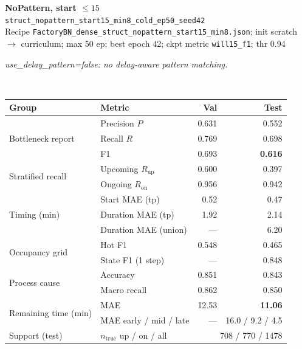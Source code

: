 \documentclass[9pt,a4paper,twocolumn]{extarticle}
\begin{document}
\noindent\begin{minipage}{\columnwidth}
\begin{center}
{\small\bfseries NoPattern, start $\le 15$}\\
{\scriptsize\texttt{struct\_nopattern\_start15\_min8\_cold\_ep50\_seed42}}\\
{\scriptsize Recipe \texttt{FactoryBN\_dense\_struct\_nopattern\_start15\_min8.json}; init scratch $\to$ curriculum; max 50 ep; best epoch 42; ckpt metric \texttt{will15\_f1}; thr 0.94}\\[1pt]
\parbox{0.96\columnwidth}{\scriptsize\itshape use\_delay\_pattern=false: no delay-aware pattern matching.}\\[2pt]
\scriptsize\setlength{\tabcolsep}{3pt}
\begin{tabular}{llrr}
\toprule
Group & Metric & Val & Test \\
\midrule
\multirow{3}{*}{Bottleneck report}
  & Precision $P$ & 0.631 & 0.552 \\
  & Recall $R$ & 0.769 & 0.698 \\
  & F1 & 0.693 & \textbf{0.616} \\
\midrule
\multirow{2}{*}{Stratified recall}
  & Upcoming $R_{\mathrm{up}}$ & 0.600 & 0.397 \\
  & Ongoing $R_{\mathrm{on}}$ & 0.956 & 0.942 \\
\midrule
\multirow{3}{*}{Timing (min)}
  & Start MAE (tp) & 0.52 & 0.47 \\
  & Duration MAE (tp) & 1.92 & 2.14 \\
  & Duration MAE (union) & --- & 6.20 \\
\midrule
\multirow{2}{*}{Occupancy grid}
  & Hot F1 & 0.548 & 0.465 \\
  & State F1 (1 step) & --- & 0.848 \\
\midrule
\multirow{2}{*}{Process cause}
  & Accuracy & 0.851 & 0.843 \\
  & Macro recall & 0.862 & 0.850 \\
\midrule
\multirow{2}{*}{Remaining time (min)}
  & MAE & 12.53 & \textbf{11.06} \\
  & MAE early / mid / late & --- & 16.0 / 9.2 / 4.5 \\
\midrule
Support (test)
  & $n_{\mathrm{true}}$ up / on / all & \multicolumn{2}{r}{708 / 770 / 1478} \\
\bottomrule
\end{tabular}
\end{center}
\end{minipage}\par\vspace{6pt}
\end{document}

